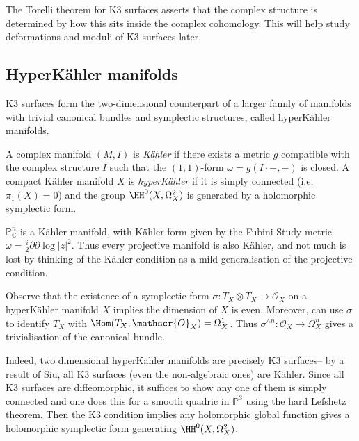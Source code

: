 The Torelli theorem for K3 surfaces asserts that the complex structure is
determined by how this sits inside the complex cohomology. This will help
study deformations and moduli of K3 surfaces later.

\subsection{HyperK\"ahler manifolds} K3 surfaces form the two-dimensional
counterpart of a larger family of manifolds with trivial canonical bundles and
symplectic structures, called hyperK\"ahler manifolds.

\begin{definition}
    A complex manifold \((M,I)\) is \textit{K\"ahler} if there exists a metric
    \(g\) compatible with the complex structure \(I\) such that the
    \((1,1)\)-form \(\omega=g(I\cdot -,-)\) is closed. A compact K\"ahler
    manifold \(X\) is \textit{hyperK\"ahler} if it is simply connected (i.e.\
    \(\pi_1(X)=0\)) and the group \(\HH^0(X,\Omega^2_X)\) is generated by a
    holomorphic symplectic form.
\end{definition}

\begin{example}
    \(\mathbb{P}^n_\mathbb{C}\) is a K\"ahler manifold, with K\"ahler form given
    by the Fubini-Study metric \(\omega=\frac{i}{2}\partial \bar\partial
    \log|z|^2\). Thus every projective manifold is also K\"ahler, and not much
    is lost by thinking of the K\"ahler condition as a mild generalisation of
    the projective condition.
\end{example}

Observe that the existence of a symplectic form \(\sigma:T_X\otimes T_X\to
\mathscr{O}_X\) on a hyperK\"ahler manifold \(X\) implies the dimension of \(X\)
is even. Moreover, can use \(\sigma\) to identify \(T_X\) with \(\Hom(T_X,\mathscr{O}_X)=\Omega^1_X\). Thus \(\sigma^{\wedge n}:\mathscr{O}_X\to \Omega^n_X\) gives a trivialisation of the canonical bundle.

Indeed, two dimensional hyperK\"ahler manifolds are precisely K3 surfaces-- by a result of Siu, all K3 surfaces (even the
non-algebraic ones) are K\"ahler. Since all K3 surfaces are diffeomorphic, it
suffices to show any one of them is simply connected and one does this for a
smooth quadric in \(\mathbb{P}^3\) using the hard Lefshetz theorem. Then the
K3 condition implies any holomorphic global function gives a holomorphic
symplectic form generating \(\HH^0(X,\Omega_X^2)\).

